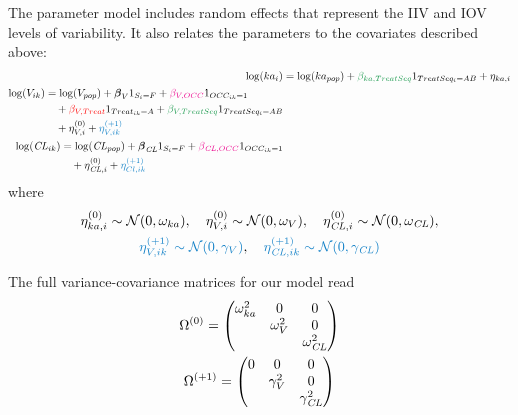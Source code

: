 The parameter model includes random effects that represent the IIV and
{\color{lightblue}IOV} levels of variability. It also relates the
parameters to the covariates described above:
\begin{align}
\log(ka_{i}) &= \log(ka_{pop}) +
{\color{mediumgreen}\beta_{ka,TreatSeq}}1_{TreatSeq_i=AB} +
\eta_{ka,i} \label{eqn:eg4-param-ka}\\
\begin{split}
\log(V_{ik}) &= \log(V_{pop}) + {\boldsymbol \beta_V}1_{S_i=F} +
{\color{magenta}\beta_{V,OCC}} 1_{OCC_{ik}=1} \\
&\quad+ {\color{red}\beta_{V,Treat}}1_{Treat_{ik}=A} + {\color{mediumgreen}\beta_{V,TreatSeq}}1_{TreatSeq_i=AB} \\
		& \quad+ \eta_{V,i}^{(0)} +  {\color{lightblue} \eta_{V,ik}^{(+1)} }
\end{split} \label{eqn:eg4-parameter-v}\\
\begin{split}
\log(\CL_{ik}) &= \log(\CL_{pop}) + {\boldsymbol \beta_{\CL}}1_{S_i=F}
+ {\color{magenta}\beta_{\CL,OCC}} 1_{OCC_{ik}=1}\\
&\quad + \eta_{\CL,i}^{(0)} + {\color{lightblue} \eta_{Cl,ik}^{(+1)} }
\end{split}\nonumber
\end{align}
where
\begin{gather*}
\eta_{ka,i}^{(0)} \sim \mathcal{N}(0, \omega_{ka}), \quad \eta_{V,i}^{(0)} \sim \mathcal{N}(0, \omega_{V}), \quad \eta_{\CL,i}^{(0)} \sim \mathcal{N}(0, \omega_{\CL}),  \\
 {\color{lightblue} \eta_{V,ik}^{(+1)} \sim \mathcal{N}(0,\gamma_V)}, \quad
 {\color{lightblue} \eta_{\CL,ik}^{(+1)} \sim \mathcal{N}(0, \gamma_{\CL})}
\end{gather*}

The full variance-covariance matrices for our model read
\begin{gather}
 \Omega^{(0)} =
 \begin{pmatrix}
  \omega_{ka}^2 	& 0 				& 0  \\
   			  	& \omega_{V}^2	& 0 	\\
  				& 				& \omega_{\mathit{CL}}^2\\
 \end{pmatrix}\label{eqn:eg4-covariance-mat}\\
 \Omega^{(+1)} =
 \begin{pmatrix}
0 & 0 & 0\\
 & \gamma_{V}^2	& 0 	\\
 & & \gamma_{\mathit{CL}}^2\\
 \end{pmatrix}\label{eqn:eg4-gamma-mat}
\end{gather}


